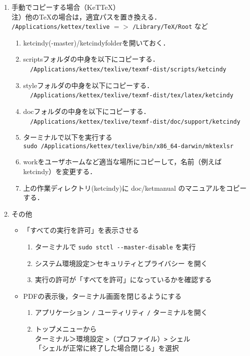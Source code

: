 \documentclass{ujarticle}
\begin{document}
\begin{enumerate}[\bf\large 1.]
\item 手動でコピーする場合（KeTTeX）\\
\hspace*{1zw}注）他のTeXの場合は，適宜パスを置き換える．\\
\hspace*{3zw}\verb|/Applications/kettex/texlive| $=>$ \verb|/Library/TeX/Root| など
  \begin{enumerate}[(1)]
  \item ketcindy(-master)/ketcindyfolderを開いておく．
  \item scriptsフォルダの中身を以下にコピーする．\\
　\verb|/Applications/kettex/texlive/texmf-dist/scripts/ketcindy|
  \item styleフォルダの中身を以下にコピーする．\\
　\verb|/Applications/kettex/texlive/texmf-dist/tex/latex/ketcindy|
  \item docフォルダの中身を以下にコピーする．\\
　\verb|/Applications/kettex/texlive/texmf-dist/doc/support/ketcindy|
  \item ターミナルで以下を実行する\\
  \hspace*{1zw}\verb|sudo /Applications/kettex/texlive/bin/x86_64-darwin/mktexlsr|
  \item workをユーザホームなど適当な場所にコピーして，名前（例えばketcindy）を変更する．
  \item 上の作業ディレクトリ(ketcindy)に doc/ketmanual のマニュアルをコピーする．
  \end{enumerate}

\item その他

\begin{itemize}
 \item 「すべての実行を許可」を表示させる
\begin{enumerate}[(1)]
\item ターミナルで \verb|sudo stctl --master-disable| を実行
\item システム環境設定＞セキュリティとプライバシー を開く
\item 実行の許可が「すべてを許可」になっているかを確認する
   \end{enumerate}

    \item PDFの表示後，ターミナル画面を閉じるようにする
       \begin{enumerate}[(1)]
        \item アプリケーション \verb|/| ユーティリティ \verb|/| ターミナルを開く
        \item トップメニューから\\
          \hspace*{5mm}ターミナル＞環境設定 \verb|>|（プロファイル）\verb|>| シェル\\
          \hspace*{10mm}「シェルが正常に終了した場合閉じる」を選択
        \end{enumerate}
\end{itemize}

\end{enumerate}
\end{document}
